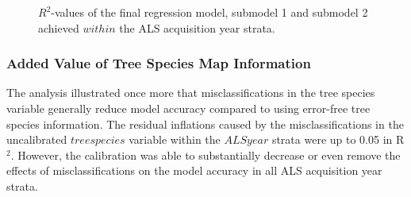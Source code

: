 \begin{figure}[H]
	\centering
	\caption{$R^2$-values of the final regression model, submodel 1 and submodel 2 achieved $within$ the ALS acquisition year strata.}
	\label{fig:r2adj_in_lyears}
\end{figure}


\subsubsection*{Added Value of Tree Species Map Information}
 The analysis illustrated once more that misclassifications in the tree species variable generally reduce model accuracy compared to using error-free tree species information. The residual inflations caused by the misclassifications in the uncalibrated $treespecies$ variable within the $ALSyear$ strata were up to 0.05 in R$^2$. However, the calibration was able to substantially decrease or even remove the effects of misclassifications on the model accuracy in all ALS acquisition year strata.


